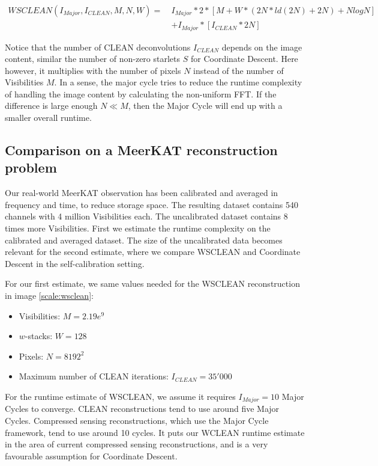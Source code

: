 \begin{equation}\label{results:clean:o}
\begin{aligned}
 WSCLEAN(I_{Major}, I_{CLEAN}, M, N,  W) =\: &I_{Major} * 2 * [M + W*(2N*ld(2N) + 2N) + N log N]\\
	&+ I_{Major} * [I_{CLEAN}*2N]
\end{aligned}
\end{equation}

Notice that the number of CLEAN deconvolutions $I_{CLEAN}$ depends on the image content, similar the number of non-zero starlets $S$ for Coordinate Descent. Here however, it multiplies with the number of pixels $N$ instead of the number of Visibilities $M$. In a sense, the major cycle tries to reduce the runtime complexity of handling the image content by calculating the non-uniform FFT. If the difference is large enough $N \ll M$, then the Major Cycle will end up with a smaller overall runtime.


\subsection{Comparison on a MeerKAT reconstruction problem}
Our real-world MeerKAT observation has been calibrated and averaged in frequency and time, to reduce storage space. The resulting dataset contains 540 channels with 4 million Visibilities each. The uncalibrated dataset contains 8 times more Visibilities. First we estimate the runtime complexity on the calibrated and averaged dataset. The size of the uncalibrated data becomes relevant for the second estimate, where we compare WSCLEAN and Coordinate Descent in the self-calibration setting.

For our first estimate, we same values needed for the WSCLEAN reconstruction in image \ref{scale:wsclean}:
\begin{itemize}
	\item Visibilities: $M=2.19e^9$
	\item $w$-stacks: $W = 128$
	\item Pixels: $N = 8192^2$
	\item Maximum number of CLEAN iterations: $I_{CLEAN} = 35'000$
\end{itemize}

For the runtime estimate of WSCLEAN, we assume it requires $I_{Major}=10$ Major Cycles to converge. CLEAN reconstructions tend to use around five Major Cycles. Compressed sensing reconstructions, which use the Major Cycle framework, tend to use around 10 cycles. It puts our WCLEAN runtime estimate in the area of current compressed sensing reconstructions, and is a very favourable assumption for Coordinate Descent.


